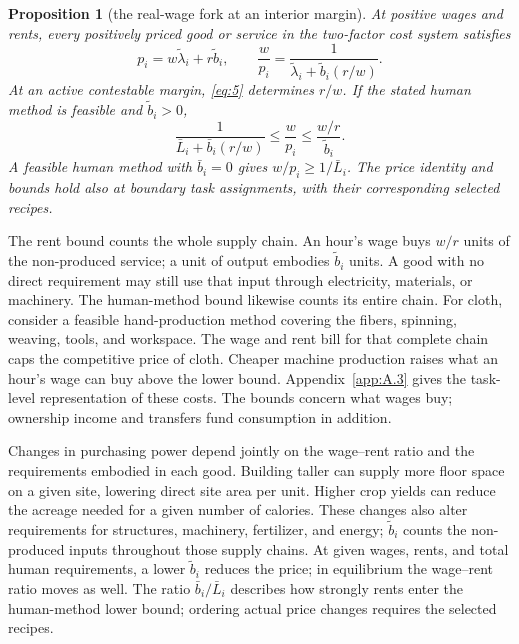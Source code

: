 \documentclass[12pt]{article}
\theoremstyle{plain}
\newtheorem{proposition}{Proposition}
\begin{document}
\begin{proposition}[the real-wage fork at an interior margin]\label{prop:4}
At positive wages and rents, every positively priced good or service in the two-factor cost system satisfies
\begin{equation}\label{eq:12}
p_i=w\widetilde\lambda_i+r\widetilde b_i,\qquad
\frac{w}{p_i}=\frac{1}{\widetilde\lambda_i+\widetilde b_i(r/w)}.
\end{equation}
At an active contestable margin, \eqref{eq:5} determines $r/w$. If the stated human method is feasible and $\widetilde b_i>0$,
\begin{equation}\label{eq:13}
\frac{1}{\bar L_i+\bar b_i(r/w)}
\le\frac{w}{p_i}
\le\frac{w/r}{\widetilde b_i}.
\end{equation}
A feasible human method with $\bar b_i=0$ gives $w/p_i\ge1/\bar L_i$. The price identity and bounds hold also at boundary task assignments, with their corresponding selected recipes.
\end{proposition}

The rent bound counts the whole supply chain. An hour's wage buys $w/r$ units of the non-produced service; a unit of output embodies $\widetilde b_i$ units. A good with no direct requirement may still use that input through electricity, materials, or machinery. The human-method bound likewise counts its entire chain. For cloth, consider a feasible hand-production method covering the fibers, spinning, weaving, tools, and workspace. The wage and rent bill for that complete chain caps the competitive price of cloth. Cheaper machine production raises what an hour's wage can buy above the lower bound. Appendix~\ref{app:A.3} gives the task-level representation of these costs. The bounds concern what wages buy; ownership income and transfers fund consumption in addition.

Changes in purchasing power depend jointly on the wage--rent ratio and the requirements embodied in each good. Building taller can supply more floor space on a given site, lowering direct site area per unit. Higher crop yields can reduce the acreage needed for a given number of calories. These changes also alter requirements for structures, machinery, fertilizer, and energy; $\widetilde b_i$ counts the non-produced inputs throughout those supply chains. At given wages, rents, and total human requirements, a lower $\widetilde b_i$ reduces the price; in equilibrium the wage--rent ratio moves as well. The ratio $\bar b_i/\bar L_i$ describes how strongly rents enter the human-method lower bound; ordering actual price changes requires the selected recipes.
\end{document}
